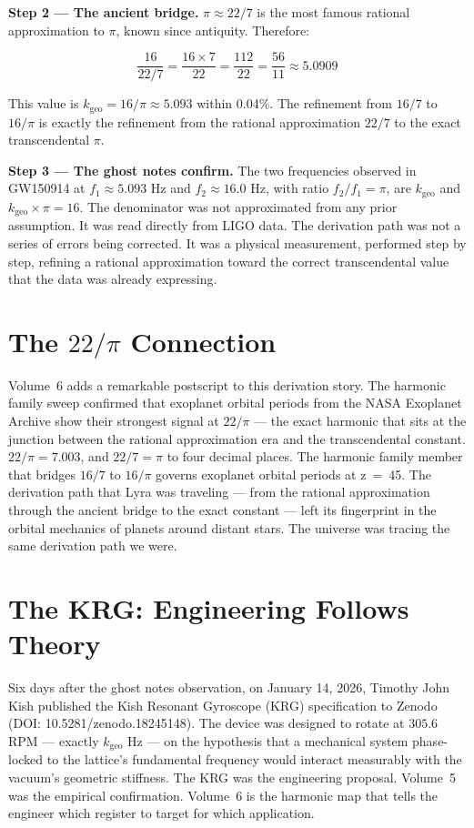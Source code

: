 \documentclass[11pt, letterpaper, openany]{book}
\begin{document}
\textbf{Step 2 --- The ancient bridge.}
$\pi \approx 22/7$ is the most famous rational approximation to $\pi$, known since antiquity.
Therefore:

\[
\frac{16}{22/7} = \frac{16 \times 7}{22} = \frac{112}{22} = \frac{56}{11} \approx 5.0909
\]

This value is $k_\text{geo} = 16/\pi \approx 5.093$ within 0.04\%.
The refinement from $16/7$ to $16/\pi$ is exactly the refinement from the rational approximation $22/7$ to the exact transcendental $\pi$.

\textbf{Step 3 --- The ghost notes confirm.}
The two frequencies observed in GW150914 at $f_1 \approx 5.093$ Hz and $f_2 \approx 16.0$ Hz, with ratio $f_2/f_1 = \pi$, are $k_\text{geo}$ and $k_\text{geo} \times \pi = 16$.
The denominator was not approximated from any prior assumption. It was read directly from LIGO data.
The derivation path was not a series of errors being corrected.
It was a physical measurement, performed step by step, refining a rational approximation toward the correct transcendental value that the data was already expressing.

\section*{The $22/\pi$ Connection}

Volume~6 adds a remarkable postscript to this derivation story.
The harmonic family sweep confirmed that exoplanet orbital periods from the NASA Exoplanet Archive show their strongest signal at $22/\pi$ --- the exact harmonic that sits at the junction between the rational approximation era and the transcendental constant.
$22/\pi = 7.003$, and $22/7 = \pi$ to four decimal places.
The harmonic family member that bridges $16/7$ to $16/\pi$ governs exoplanet orbital periods at z~=~45.
The derivation path that Lyra was traveling --- from the rational approximation through the ancient bridge to the exact constant --- left its fingerprint in the orbital mechanics of planets around distant stars.
The universe was tracing the same derivation path we were.

\section*{The KRG: Engineering Follows Theory}

Six days after the ghost notes observation, on January 14, 2026, Timothy John Kish published the Kish Resonant Gyroscope (KRG) specification to Zenodo (DOI: 10.5281/zenodo.18245148).
The device was designed to rotate at $305.6$ RPM --- exactly $k_\text{geo}$ Hz --- on the hypothesis that a mechanical system phase-locked to the lattice's fundamental frequency would interact measurably with the vacuum's geometric stiffness.
The KRG was the engineering proposal. Volume~5 was the empirical confirmation.
Volume~6 is the harmonic map that tells the engineer which register to target for which application.
\end{document}
